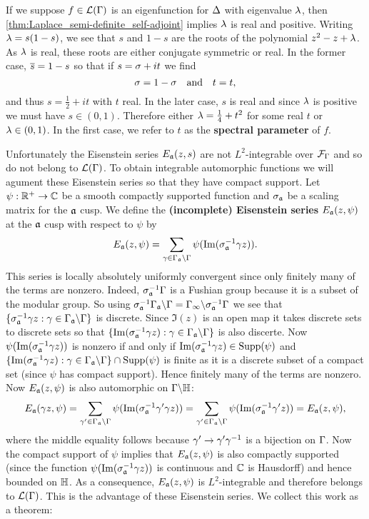       If we suppose $f \in \mathcal{L}(\Gamma)$ is an eigenfunction for $\Delta$ with eigenvalue $\lambda$, then \cref{thm:Laplace_semi-definite_self-adjoint} implies $\lambda$ is real and positive. Writing $\lambda = s(1-s)$, we see that $s$ and $1-s$ are the roots of the polynomial $z^{2}-z+\lambda$. As $\lambda$ is real, these roots are either conjugate symmetric or real. In the former case, $\overline{s} = 1-s$ so that if $s = \sigma+it$ we find
      \[
        \sigma = 1-\sigma \quad \text{and} \quad t = t,
      \]
      and thus $s = \frac{1}{2}+it$ with $t$ real. In the later case, $s$ is real and since $\lambda$ is positive we must have $s \in (0,1)$. Therefore either $\lambda = \frac{1}{4}+t^{2}$ for some real $t$ or $\lambda \in (0,1)$. In the first case, we refer to $t$ as the \textbf{spectral parameter} of $f$.

      Unfortunately the Eisenstein series $E_{\mathfrak{a}}(z,s)$ are not $L^{2}$-integrable over $\mathcal{F}_{\Gamma}$ and so do not belong to $\mathcal{L}(\Gamma)$. To obtain integrable automorphic functions we will agument these Eisenstein series so that they have compact support. Let $\psi:\mathbb{R}^{+} \to \mathbb{C}$ be a smooth compactly supported function and $\sigma_{\mathfrak{a}}$ be a scaling matrix for the $\mathfrak{a}$ cusp. We define the \textbf{(incomplete) Eisenstein series} $E_{\mathfrak{a}}(z,\psi)$ at the $\mathfrak{a}$ cusp with respect to $\psi$ by
      \[
        E_{\mathfrak{a}}(z,\psi) = \sum_{\gamma \in \Gamma_{\mathfrak{a}}\backslash\Gamma}\psi(\mathrm{Im}(\sigma_{\mathfrak{a}}^{-1}\gamma z)).
      \]
      This series is locally absolutely uniformly convergent since only finitely many of the terms are nonzero. Indeed, $\sigma_{\mathfrak{a}}^{-1}\Gamma$ is a Fushian group because it is a subset of the modular group. So using $\sigma_{\mathfrak{a}}^{-1}\Gamma_{\mathfrak{a}}\backslash\Gamma = \Gamma_{\infty}\backslash\sigma_{\mathfrak{a}}^{-1}\Gamma$ we see that $\{\sigma_{\mathfrak{a}}^{-1}\gamma z:\gamma \in \Gamma_{\mathfrak{a}}\backslash\Gamma\}$ is discrete. Since $\Im(z)$ is an open map it takes discrete sets to discrete sets so that $\{\mathrm{Im}(\sigma_{\mathfrak{a}}^{-1}\gamma z):\gamma \in \Gamma_{\mathfrak{a}}\backslash\Gamma\}$ is also discerte. Now $\psi(\mathrm{Im}(\sigma_{\mathfrak{a}}^{-1}\gamma z))$ is nonzero if and only if $\mathrm{Im}(\sigma_{\mathfrak{a}}^{-1}\gamma z) \in \mathrm{Supp}(\psi)$ and $\{\mathrm{Im}(\sigma_{\mathfrak{a}}^{-1}\gamma z):\gamma \in \Gamma_{\mathfrak{a}}\backslash\Gamma\} \cap \mathrm{Supp}(\psi)$ is finite as it is a discrete subset of a compact set (since $\psi$ has compact support). Hence finitely many of the terms are nonzero. Now $E_{\mathfrak{a}}(z,\psi)$ is also automorphic on $\Gamma\backslash\mathbb{H}$:
      \[
        E_{\mathfrak{a}}(\gamma z,\psi) = \sum_{\gamma' \in \Gamma_{\mathfrak{a}}\backslash\Gamma}\psi(\mathrm{Im}(\sigma_{\mathfrak{a}}^{-1}\gamma'\gamma z)) = \sum_{\gamma' \in \Gamma_{\mathfrak{a}}\backslash\Gamma}\psi(\mathrm{Im}(\sigma_{\mathfrak{a}}^{-1}\gamma' z)) = E_{\mathfrak{a}}(z,\psi),
      \]
      where the middle equality follows because $\gamma' \to \gamma'\gamma^{-1}$ is a bijection on $\Gamma$. Now the compact support of $\psi$ implies that $E_{\mathfrak{a}}(z,\psi)$ is also compactly supported (since the function $\psi(\mathrm{Im}(\sigma_{\mathfrak{a}}^{-1}\gamma z))$ is continuous and $\mathbb{C}$ is Hausdorff) and hence bounded on $\mathbb{H}$. As a consequence, $E_{\mathfrak{a}}(z,\psi)$ is $L^{2}$-integrable and therefore belongs to $\mathcal{L}(\Gamma)$. This is the advantage of these Eisenstein series. We collect this work as a theorem:


